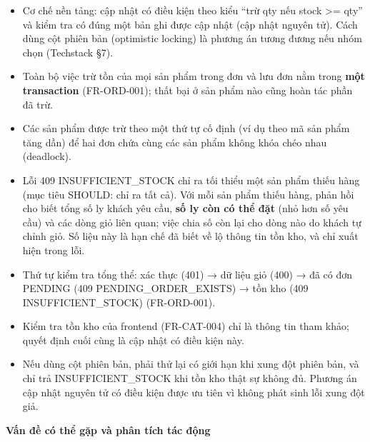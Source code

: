 \documentclass[11pt,a4paper,oneside]{report}
\begin{document}
\begin{itemize}
\item
  Cơ chế nền tảng: cập nhật có điều kiện theo kiểu ``trừ qty nếu stock \textgreater= qty'' và kiểm tra có đúng một bản ghi được cập nhật (cập nhật nguyên tử). Cách dùng cột phiên bản (optimistic locking) là phương án tương đương nếu nhóm chọn (Techstack §7).
\item
  Toàn bộ việc trừ tồn của mọi sản phẩm trong đơn và lưu đơn nằm trong \textbf{một transaction} (FR-ORD-001); thất bại ở sản phẩm nào cũng hoàn tác phần đã trừ.
\item
  Các sản phẩm được trừ theo một thứ tự cố định (ví dụ theo mã sản phẩm tăng dần) để hai đơn chứa cùng các sản phẩm không khóa chéo nhau (deadlock).
\item
  Lỗi 409 INSUFFICIENT\_STOCK chỉ ra tối thiểu một sản phẩm thiếu hàng (mục tiêu SHOULD: chỉ ra tất cả). Với mỗi sản phẩm thiếu hàng, phản hồi cho biết tổng số ly khách yêu cầu, \textbf{số ly còn có thể đặt} (nhỏ hơn số yêu cầu) và các dòng giỏ liên quan; việc chia số còn lại cho dòng nào do khách tự chỉnh giỏ. Số liệu này là hạn chế đã biết về lộ thông tin tồn kho, và chỉ xuất hiện trong lỗi.
\item
  Thứ tự kiểm tra tổng thể: xác thực (401) → dữ liệu giỏ (400) → đã có đơn PENDING (409 PENDING\_ORDER\_EXISTS) → tồn kho (409 INSUFFICIENT\_STOCK) (FR-ORD-001).
\item
  Kiểm tra tồn kho của frontend (FR-CAT-004) chỉ là thông tin tham khảo; quyết định cuối cùng là cập nhật có điều kiện này.
\item
  Nếu dùng cột phiên bản, phải thử lại có giới hạn khi xung đột phiên bản, và chỉ trả INSUFFICIENT\_STOCK khi tồn kho thật sự không đủ. Phương án cập nhật nguyên tử có điều kiện được ưu tiên vì không phát sinh lỗi xung đột giả.
\end{itemize}

\textbf{Vấn đề có thể gặp và phân tích tác động}
\end{document}
